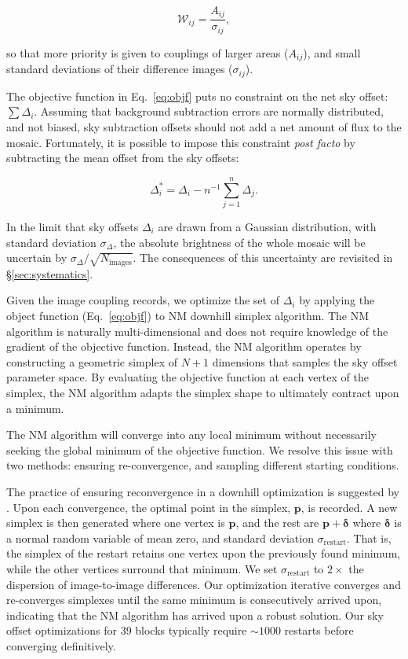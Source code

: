\documentclass[iop,tighten]{emulateapj}
\newcommand{\vect}[1]{\boldsymbol{#1}} %
\newcommand{\Eq}[1]{Eq.~\ref{eq:#1}}  %
\newcommand{\Sec}[1]{\S\ref{sec:#1}}  %
\begin{document}
\begin{equation}
    \mathcal{W}_{ij} = \frac{A_{ij}}{\sigma_{ij}},
\end{equation}

\noindent so that more priority is given to couplings of larger areas ($A_{ij}$), and small standard deviations of their difference images ($\sigma_{ij}$).

The objective function in \Eq{objf} puts no constraint on the net sky offset: $\sum \Delta_i$.
Assuming that background subtraction errors are normally distributed, and not biased, sky subtraction offsets should not add a net amount of flux to the mosaic.
Fortunately, it is possible to impose this constraint \textit{post facto} by subtracting the mean offset from the sky offsets:

\begin{equation}
    \Delta_i^* = \Delta_i - n^{-1}\sum_{j=1}^n \Delta_j.
    \label{eq:netzero}
\end{equation}

\noindent In the limit that sky offsets $\Delta_i$ are drawn from a Gaussian distribution, with standard deviation $\sigma_\Delta$, the absolute brightness of the whole mosaic will be uncertain by $\sigma_\Delta / \sqrt{N_\mathrm{images}}$.
The consequences of this uncertainty are revisited in \Sec{systematics}.

Given the image coupling records, we optimize the set of $\Delta_i$ by applying the object function (\Eq{objf}) to NM downhill simplex algorithm.
The NM algorithm is naturally multi-dimensional and does not require knowledge of the gradient of the objective function.
Instead, the NM algorithm operates by constructing a geometric simplex of $N+1$ dimensions that samples the sky offset parameter space.
By evaluating the objective function at each vertex of the simplex, the NM algorithm adapts the simplex shape to ultimately contract upon a minimum.

The NM algorithm will converge into any local minimum without necessarily seeking the global minimum of the objective function.
We resolve this issue with two methods: ensuring re-convergence, and sampling different starting conditions.

The practice of ensuring reconvergence in a downhill optimization is suggested by \cite{Press:2007}.
Upon each convergence, the optimal point in the simplex, $\vect{p}$, is recorded.
A new simplex is then generated where one vertex is $\vect{p}$, and the rest are $\vect{p}+\vect{\delta}$ where $\vect{\delta}$ is a normal random variable of mean zero, and standard deviation $\sigma_\mathrm{restart}$.
That is, the simplex of the restart retains one vertex upon the previously found minimum, while the other vertices surround that minimum.
We set $\sigma_\mathrm{restart}$ to $2\times$ the dispersion of image-to-image differences.
Our optimization iterative converges and re-converges simplexes until the same minimum is consecutively arrived upon, indicating that the NM algorithm has arrived upon a robust solution.
Our sky offset optimizations for 39 blocks typically require $\sim1000$ restarts before converging definitively.
\end{document}
